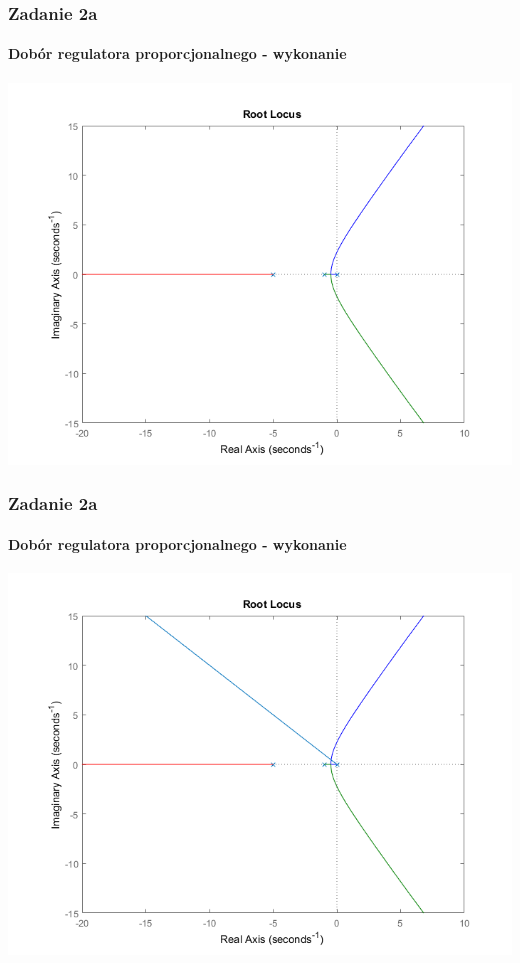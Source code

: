 \documentclass{beamer}
\begin{document}
\begin{frame}\frametitle{Zadanie 2a}\framesubtitle{Dobór regulatora proporcjonalnego - wykonanie}
\centering	\includegraphics[scale=0.5]{a-rlocus-bez-linii.png}
\end{frame}

\begin{frame}\frametitle{Zadanie 2a}\framesubtitle{Dobór regulatora proporcjonalnego - wykonanie}
\centering	\includegraphics[scale=0.5]{a-rlocus.png}
\end{frame}
\end{document}
